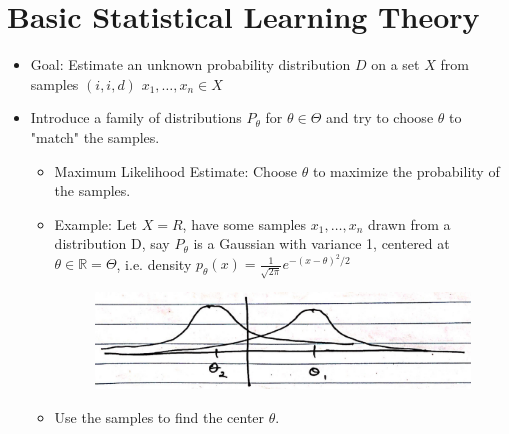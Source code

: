 \section{Basic Statistical Learning Theory}
\begin{itemize}
	\item Goal: Estimate an unknown probability distribution $D$ on a set $X$ from samples $(i,i,d)$ $x_{1}, \ldots, x_{n} \in X$
	\item Introduce a family of distributions $P_{\theta}$ for $\theta \in \Theta$ and try to choose $\theta$ to "match" the samples.
	\begin{itemize}
		\item Maximum Likelihood Estimate: Choose $\theta$ to maximize the probability of the samples.
		\item Example: Let $X=R$, have some samples $x_{1}, \ldots, x_{n}$ drawn from a distribution D, say $P_{\theta}$ is a Gaussian with variance 1, centered at $\theta \in \mathbb{R}=\Theta$, i.e. density  $p_{\theta}(x)=\frac{1}{\sqrt{2 \pi}} e^{-(x-\theta)^{2} / 2}$ 
		
		   \begin{figure}[ht!]
		  	\centering
		  	\includegraphics[width=.55\textwidth]{../figures/probabilityLR2.png}  
		  \end{figure}
		\item Use the samples to find the center $\theta$.
	\end{itemize}
\end{itemize}


